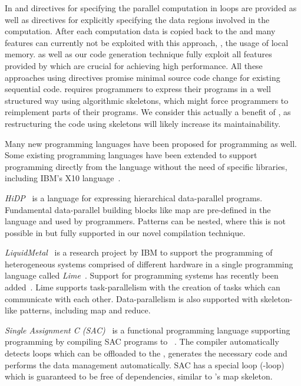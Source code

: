 In \OpenACC and  directives for specifying the parallel computation in loops are provided as well as directives for explicitly specifying the data regions involved in the computation.
After each computation data is copied back to the \CPU and many \GPU features can currently not be exploited with this approach, \eg, the usage of local memory.
\SkelCL as well as our code generation technique fully exploit all features provided by \GPUs which are crucial for achieving high performance.
All these approaches using directives promise minimal source code change for existing sequential code.
\SkelCL requires programmers to express their programs in a well structured way using algorithmic skeletons, which might force programmers to reimplement parts of their programs.
We consider this actually a benefit of \SkelCL, as restructuring the code using skeletons will likely increase its maintainability.


\pagebreak

Many new programming languages have been proposed for \GPU programming as well.
Some existing programming languages have been extended to support \GPU programming directly from the language without the need of specific libraries, including IBM's X10 language~\cite{TakeuchiMaKaHoSuSuOn2011}.

\bigskip

\emph{{\small HiDP}}~\cite{ZhangM13} is a language for expressing hierarchical data-parallel programs.
Fundamental data-parallel building blocks like map are pre-defined in the language and used by programmers.
Patterns can be nested, where this is not possible in \SkelCL but fully supported in our novel compilation technique.

\bigskip

\emph{LiquidMetal}~\cite{HuangHBR08} is a research project by IBM to support the programming of heterogeneous systems comprised of different hardware in a single programming language called \emph{Lime}~\cite{AuerbachBCR10}.
Support for programming \GPU systems has recently been added~\cite{DubachCRBF12}.
Lime supports task-parallelism with the creation of tasks which can communicate with each other.
Data-parallelism is also supported with skeleton-like patterns, including map and reduce.

\bigskip

\emph{Single Assignment C (SAC)}~\cite{GrelckS06} is a functional programming language supporting \GPU programming by compiling SAC programs to \CUDA~\cite{GuoTS11}.
The compiler automatically detects loops which can be offloaded to the \GPU, generates the necessary \CUDA code and performs the data management automatically.
SAC has a special loop (-loop) which is guaranteed to be free of dependencies, similar to \SkelCL's map skeleton.

